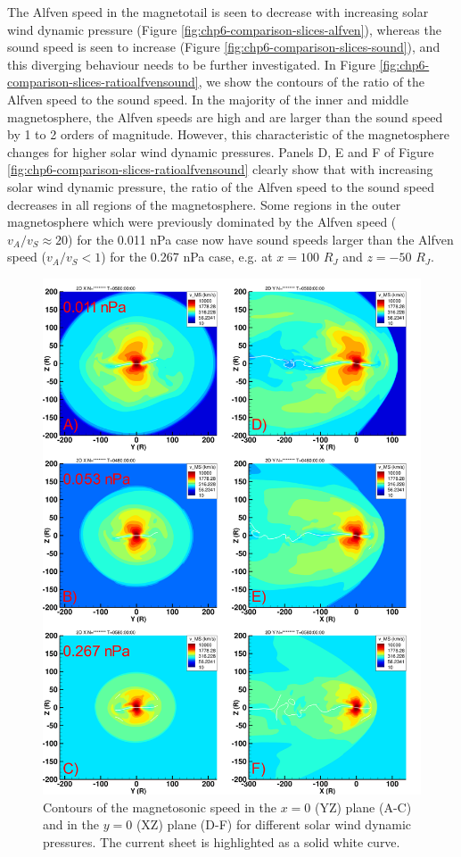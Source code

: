 The Alfven speed in the magnetotail is seen to decrease with increasing solar wind dynamic pressure (Figure \ref{fig:chp6-comparison-slices-alfven}), whereas the sound speed is seen to increase (Figure \ref{fig:chp6-comparison-slices-sound}), and this diverging behaviour needs to be further investigated. In Figure \ref{fig:chp6-comparison-slices-ratioalfvensound}, we show the contours of the ratio of the Alfven speed to the sound speed. In the majority of the inner and middle magnetosphere, the Alfven speeds are high and are larger than the sound speed by 1 to 2 orders of magnitude. However, this characteristic of the magnetosphere changes for higher solar wind dynamic pressures. Panels D, E and F of Figure \ref{fig:chp6-comparison-slices-ratioalfvensound} clearly show that with increasing solar wind dynamic pressure, the ratio of the Alfven speed to the sound speed decreases in all regions of the magnetosphere. Some regions in the outer magnetosphere which were previously dominated by the Alfven speed ($v_A/v_S \approx 20$) for the 0.011 nPa case now have sound speeds larger than the Alfven speed ($v_A/v_S < 1$) for the 0.267 nPa case, e.g. at $x=100$ $R_J$ and $z=-50$ $R_J$. 

\begin{figure}
    \centering
    \includegraphics[height=0.9\textheight]{images6/compare_runs_currentsheet_MagnetosonicSpeed.png}
    \caption{Contours of the magnetosonic speed in the $x=0$ (YZ) plane (A-C) and in the $y=0$ (XZ) plane (D-F) for different solar wind dynamic pressures. The current sheet is highlighted as a solid white curve.}
    \label{fig:chp6-comparison-slices-magnetosonic}
\end{figure}

